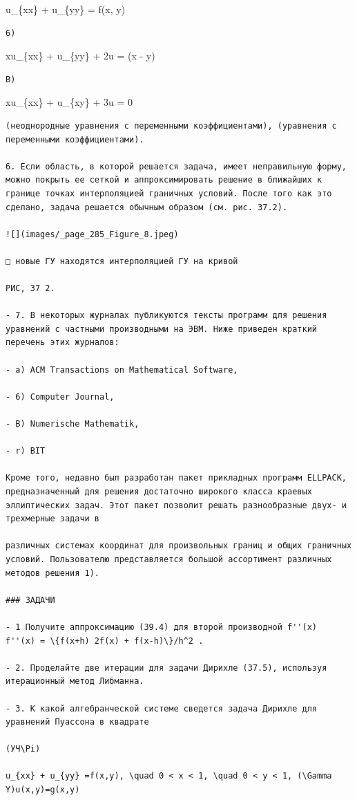 \documentclass[
  ukrainian,
]{article}
\begin{document}
u\_\{xx\} + u\_\{yy\} = f(x, y)

\begin{verbatim}
6)
\end{verbatim}

xu\_\{xx\} + u\_\{yy\} + 2u = \sin(x - y)

\begin{verbatim}
B)
\end{verbatim}

\sin xu\_\{xx\} + u\_\{xy\} + 3u = 0

\begin{verbatim}
(неоднородные уравнения с переменными коэффициентами), (уравнения с переменными коэффициентами).

6. Если область, в которой решается задача, имеет неправильную форму, можно покрыть ее сеткой и аппроксимировать решение в ближайших к границе точках интерполяцией граничных условий. После того как это сделано, задача решается обычным образом (см. рис. 37.2).

![](images/_page_285_Figure_8.jpeg)

□ новые ГУ находятся интерполяцией ГУ на кривой

РИС, 37 2.

- 7. В некоторых журналах публикуются тексты программ для решения уравнений с частными производными на ЭВМ. Ниже приведен краткий перечень этих журналов:

- a) ACM Transactions on Mathematical Software,

- 6) Computer Journal,

- B) Numerische Mathematik,

- r) BIT

Кроме того, недавно был разработан пакет прикладных программ ELLPACK, предназначенный для решения достаточно широкого класса краевых эллиптических задач. Этот пакет позволит решать разнообразные двух- и трехмерные задачи в

различных системах координат для произвольных границ и общих граничных условий. Пользователю представляется большой ассортимент различных методов решения 1).

### ЗАДАЧИ

- 1 Получите аппроксимацию (39.4) для второй производной f''(x)  f''(x) = \{f(x+h) 2f(x) + f(x-h)\}/h^2 .

- 2. Проделайте две итерации для задачи Дирихле (37.5), используя итерационный метод Либманна.

- 3. К какой алгебранческой системе сведется задача Дирихле для уравнений Пуассона в квадрате

(УЧ\Pi)

u_{xx} + u_{yy} =f(x,y), \quad 0 < x < 1, \quad 0 < y < 1, (\Gamma Y)u(x,y)=g(x,y)
\end{verbatim}
\end{document}

